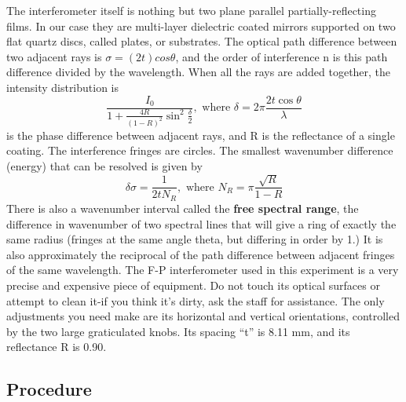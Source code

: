 \documentclass{../lab}
\begin{document}
\begin{enumerate}
    The interferometer itself is nothing but two plane parallel partially-reflecting films. In our case they are multi-layer dielectric coated mirrors supported on two flat quartz discs, called plates, or substrates. The optical path difference between two adjacent rays is $\sigma=(2t)cos\theta $, and the order of interference n is this path difference divided by the wavelength. When all the rays are added together, the intensity distribution is
    \[
    \frac{I_0}{1+\frac{4R}{(1-R)^2}\sin^2\frac{\delta}{2}},
    \textrm{ where }
    \delta = 2 \pi \frac{2t \cos\theta}{\lambda}
    \]
    is the phase difference between adjacent rays, and R is the reflectance of a single coating. The interference fringes are circles. The smallest wavenumber difference (energy) that can be resolved is given by
    \[
    \delta\sigma = \frac{1}{2 t N_R},
    \textrm{ where }
    N_R = \pi \frac{\sqrt{R}}{1-R}
    \]
    There is also a wavenumber interval called the \textbf{free spectral range}, the difference in wavenumber of two spectral lines that will give a ring of exactly the same radius (fringes at the same angle theta, but differing in order by 1.) It is also approximately the reciprocal of the path difference between adjacent fringes of the same wavelength. The F-P interferometer used in this experiment is a very precise and expensive piece of equipment. Do not touch its optical surfaces or attempt to clean it-if you think it's dirty, ask the staff for assistance. The only adjustments you need make are its horizontal and vertical orientations, controlled by the two large graticulated knobs. Its spacing ``t'' is 8.11 mm, and its reflectance R is 0.90.

\end{enumerate}

\subsection{Procedure}
\end{document}
